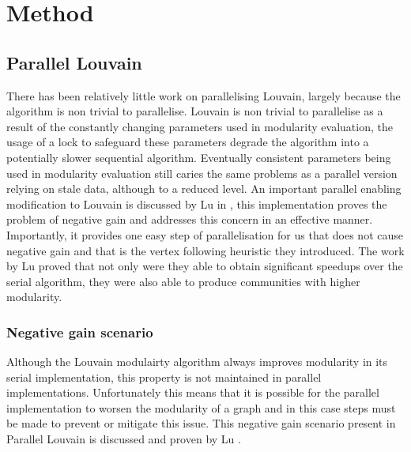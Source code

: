 \chapter{Method}


\section{Parallel Louvain}
There has been relatively little work on parallelising Louvain, largely because the algorithm is non trivial to parallelise. Louvain is non trivial to parallelise as a result of the constantly changing parameters used in modularity evaluation, the usage of a lock to safeguard these parameters degrade the algorithm into a potentially slower sequential algorithm. Eventually consistent parameters being used in modularity evaluation still caries the same problems as a parallel version relying on stale data, although to a reduced level. An important parallel enabling modification to Louvain is discussed by Lu in \cite{lu2015parallel}, this implementation proves the problem of negative gain and addresses this concern in an effective manner. Importantly, it provides one easy step of parallelisation for us that does not cause negative gain and that is the vertex following heuristic they introduced. The work by Lu proved that not only were they able to obtain significant speedups over the serial algorithm, they were also able to produce communities with higher modularity. 

\subsection{Negative gain scenario}
Although the Louvain modulairty algorithm always improves modularity in its serial implementation, this property is not maintained in parallel implementations. Unfortunately this means that it is possible for the parallel implementation to worsen the modularity of a graph and in this case steps must be made to prevent or mitigate this issue. This negative gain scenario present in Parallel Louvain is discussed and proven by Lu \cite{lu2015parallel}.



